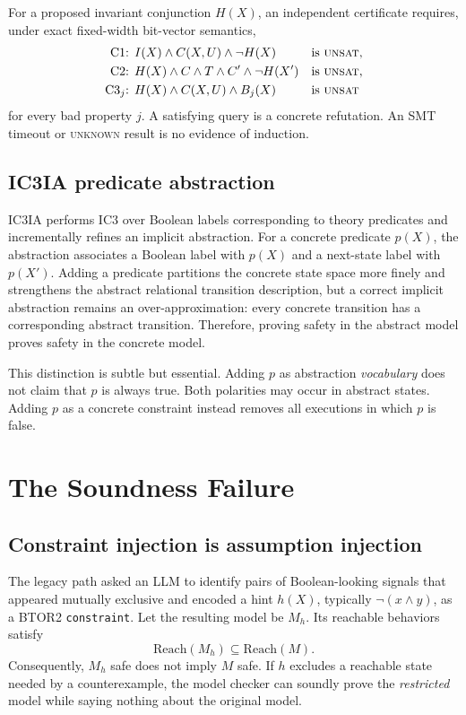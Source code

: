 \documentclass[10pt]{article}
\newcommand{\icthreeia}{\textsc{IC3IA}}
\newcommand{\btor}{\textsc{BTOR2}}
\newcommand{\code}[1]{\texttt{#1}}
\newcommand{\unsat}{\textsc{unsat}}
\newcommand{\unknown}{\textsc{unknown}}
\begin{document}
For a proposed invariant conjunction $H(X)$, an independent certificate
requires, under exact fixed-width bit-vector semantics,
\begin{align}
  \text{C1: }& I(X)\land C(X,U)\land\neg H(X) &&\text{is \unsat},\label{eq:c1}\\
  \text{C2: }& H(X)\land C\land T\land C'\land\neg H(X') &&\text{is \unsat},\label{eq:c2}\\
  \text{C3$_j$: }& H(X)\land C(X,U)\land B_j(X) &&\text{is \unsat}\label{eq:c3}
\end{align}
for every bad property $j$.  A satisfying query is a concrete refutation.
An SMT timeout or \unknown{} result is no evidence of induction.

\subsection{IC3IA predicate abstraction}

\icthreeia{} performs IC3 over Boolean labels corresponding to theory
predicates and incrementally refines an implicit abstraction.  For a concrete
predicate $p(X)$, the abstraction associates a Boolean label with $p(X)$ and a
next-state label with $p(X')$.  Adding a predicate partitions the concrete
state space more finely and strengthens the abstract relational transition
description, but a correct implicit abstraction remains an over-approximation:
every concrete transition has a corresponding abstract transition.  Therefore,
proving safety in the abstract model proves safety in the concrete model.

This distinction is subtle but essential.  Adding $p$ as abstraction
\emph{vocabulary} does not claim that $p$ is always true.  Both polarities may
occur in abstract states.  Adding $p$ as a concrete constraint instead removes
all executions in which $p$ is false.

\section{The Soundness Failure}
\label{sec:failure}

\subsection{Constraint injection is assumption injection}

The legacy path asked an LLM to identify pairs of Boolean-looking signals that
appeared mutually exclusive and encoded a hint $h(X)$, typically
$\neg(x\land y)$, as a \btor{} \code{constraint}.  Let the resulting model be
$M_h$.  Its reachable behaviors satisfy
\[
  \mathrm{Reach}(M_h)\subseteq\mathrm{Reach}(M).
\]
Consequently, $M_h$ safe does not imply $M$ safe.  If $h$ excludes a reachable
state needed by a counterexample, the model checker can soundly prove the
\emph{restricted} model while saying nothing about the original model.
\end{document}
